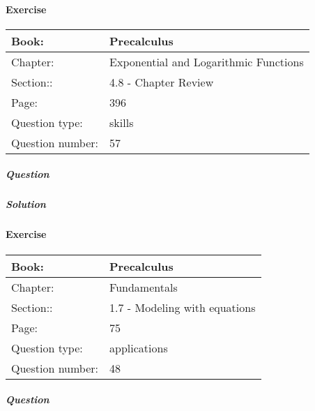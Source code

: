 \documentclass{article}
\begin{document}
        
            \newpage
            \paragraph{Exercise}\par
            \noindent
            \begin{tabularx}{1\textwidth}{
                    p{}
                    p{}
                }
                \toprule
                Book: & Precalculus
                \\
                \midrule
                Chapter: & Exponential and Logarithmic Functions
                \\
                \midrule
                Section:: & 4.8 - Chapter Review
                \\
                \midrule
                Page: & 396
                \\
                \midrule
                Question type: & skills
                \\
                \midrule
                Question number: & 57
                \\
                \bottomrule
            \end{tabularx}
            \subparagraph{Question}
            
            \subparagraph{Solution}
            
            
            \newpage
            \paragraph{Exercise}\par
            \noindent
            \begin{tabularx}{1\textwidth}{
                    p{}
                    p{}
                }
                \toprule
                Book: & Precalculus
                \\
                \midrule
                Chapter: & Fundamentals
                \\
                \midrule
                Section:: & 1.7 - Modeling with equations
                \\
                \midrule
                Page: & 75
                \\
                \midrule
                Question type: & applications
                \\
                \midrule
                Question number: & 48
                \\
                \bottomrule
            \end{tabularx}
            \subparagraph{Question}
            
\end{document}
